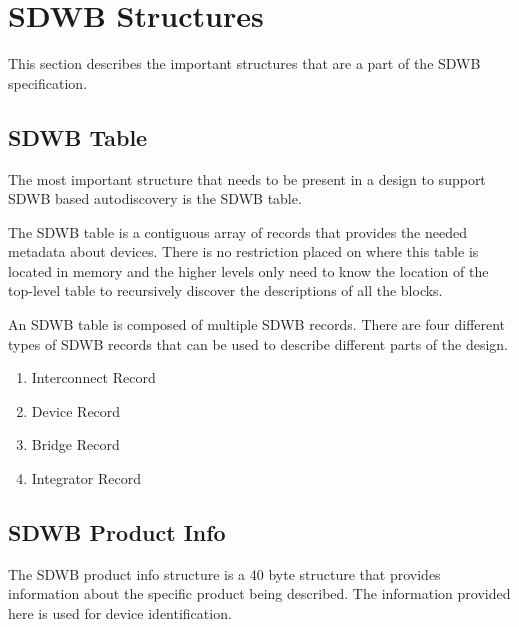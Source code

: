 \documentclass[a4paper, 12pt]{article}
\begin{document}

\section{SDWB Structures}

This section describes the important structures that are a part of the SDWB specification.

\subsection{SDWB Table}

The most important structure that needs to be present in a design to support SDWB
based autodiscovery is the SDWB table.

The SDWB table is a contiguous array of records that provides the needed metadata
about devices. There is no restriction placed on where this table is located in
memory and the higher levels only need to know the location of the top-level table
to recursively discover the descriptions of all the blocks.

An SDWB table is composed of multiple SDWB records. There are four different types of
SDWB records that can be used to describe different parts of the design.

\begin{enumerate}
\item Interconnect Record
\item Device Record
\item Bridge Record
\item Integrator Record
\end{enumerate}

\subsection{SDWB Product Info}

The SDWB product info structure is a 40 byte structure that provides information about
the specific product being described. The information provided here is used for device
identification.
\end{document}
